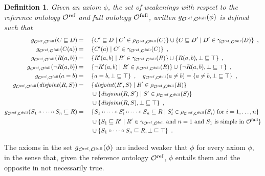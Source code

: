 \documentclass[
]{ceurart}
\newtheorem{definition}{Definition}
\newtheorem{example}{Example}
\begin{document}
\begin{definition}
  Given an axiom $\phi$, the set of \emph{weakenings} with respect to the reference ontology ${\mathcal{O}^\textnormal{ref}}$ and full ontology ${\mathcal{O}^\textnormal{full}}$, written $g_{{\mathcal{O}^\textnormal{ref}},{\mathcal{O}^\textnormal{full}}}(\phi)$ is defined such that
  \begin{alignat*}{2}
    g_{{\mathcal{O}^\textnormal{ref}},{\mathcal{O}^\textnormal{full}}}(C \sqsubseteq D) &={} &&\{ C' \sqsubseteq D \mid C' \in \rho_{{\mathcal{O}^\textnormal{ref}},{\mathcal{O}^\textnormal{full}}} (C) \} \cup \{ C \sqsubseteq D' \mid D' \in \gamma_{{\mathcal{O}^\textnormal{ref}},{\mathcal{O}^\textnormal{full}}}(D) \} \enspace, \\
    g_{{\mathcal{O}^\textnormal{ref}},{\mathcal{O}^\textnormal{full}}}(C(a)) &={} && \{ C'(a) \mid C' \in \gamma_{{\mathcal{O}^\textnormal{ref}},{\mathcal{O}^\textnormal{full}}}(C) \} \enspace, \\
    g_{{\mathcal{O}^\textnormal{ref}},{\mathcal{O}^\textnormal{full}}}(R(a, b)) &={} && \{ R'(a, b) \mid R' \in \gamma_{{\mathcal{O}^\textnormal{ref}},{\mathcal{O}^\textnormal{full}}}(R) \} \cup \{ R(a, b), \bot \sqsubseteq \top \} \enspace, \\
    g_{{\mathcal{O}^\textnormal{ref}},{\mathcal{O}^\textnormal{full}}}(\lnot R(a, b)) &={} && \{ \lnot R'(a, b) \mid R' \in \rho_{{\mathcal{O}^\textnormal{ref}},{\mathcal{O}^\textnormal{full}}}(R) \} \cup \{ \lnot R(a, b), \bot \sqsubseteq \top \} \enspace, \\
    g_{{\mathcal{O}^\textnormal{ref}},{\mathcal{O}^\textnormal{full}}}(a = b) &={} && \{ a = b, \bot \sqsubseteq \top \} \enspace,
    \quad g_{{\mathcal{O}^\textnormal{ref}},{\mathcal{O}^\textnormal{full}}}(a \not= b) = \{ a \not= b, \bot \sqsubseteq \top \} \enspace, \\
    g_{{\mathcal{O}^\textnormal{ref}},{\mathcal{O}^\textnormal{full}}}(\mathit{disjoint}(R, S)) &={} &&\{ \mathit{disjoint}(R', S) \mid R' \in \rho_{{\mathcal{O}^\textnormal{ref}},{\mathcal{O}^\textnormal{full}}} (R) \} \\
    &&& \cup \{ \mathit{disjoint}(R, S') \mid S' \in \rho_{{\mathcal{O}^\textnormal{ref}},{\mathcal{O}^\textnormal{full}}}(S) \} \\
    &&& \cup \{ \mathit{disjoint} (R, S), \bot \sqsubseteq \top \} \enspace, \\
    g_{{\mathcal{O}^\textnormal{ref}},{\mathcal{O}^\textnormal{full}}}(S_1 \circ \cdots \circ S_n \sqsubseteq R) &={} && \{ S_1 \circ \cdots \circ S_i' \circ \cdots \circ S_n \sqsubseteq R \mid S_i' \in \rho_{{\mathcal{O}^\textnormal{ref}},{\mathcal{O}^\textnormal{full}}}(S_i) \text{ for } i = 1, \dots, n \} \\
    &&& \cup \{ S_1 \sqsubseteq R' \mid R' \in \gamma_{{\mathcal{O}^\textnormal{ref}},{\mathcal{O}^\textnormal{full}}} \text{ and } n = 1 \text{ and } S_1 \text{ is simple in } {\mathcal{O}^\textnormal{full}} \} \\
    &&& \cup \{ S_1 \circ \cdots \circ S_n \sqsubseteq R, \bot \sqsubseteq \top \} \enspace.
  \end{alignat*}
\end{definition}


The axioms in the set $g_{{\mathcal{O}^\textnormal{ref}},{\mathcal{O}^\textnormal{full}}}(\phi)$ are indeed weaker that $\phi$ for every axiom $\phi$, in the sense that, given the reference ontology ${\mathcal{O}^\textnormal{ref}}$, $\phi$ entails them and the opposite in not necessarily true.
\end{document}
